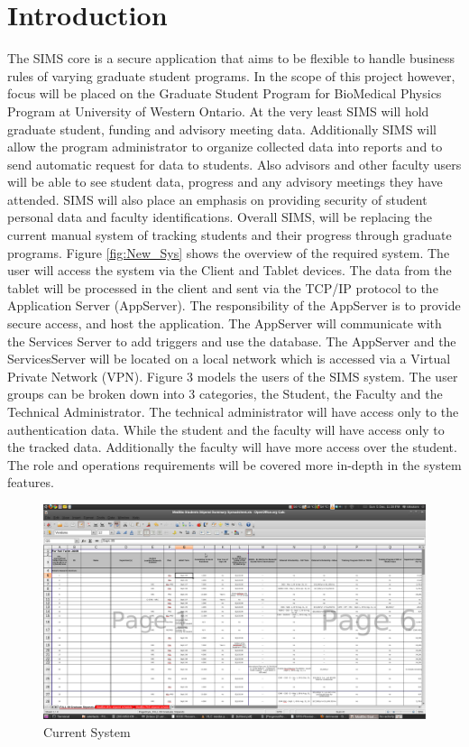 \documentclass{journal}
\begin{document}
\tableofcontents

\section{Introduction}
The SIMS core is a secure application that aims to be flexible to handle business rules of varying graduate
student programs. In the scope of this project however, focus will be placed on the Graduate Student
Program for BioMedical Physics Program at University of Western Ontario. At the very least SIMS
will hold graduate student, funding and advisory meeting data. Additionally SIMS will allow the program
administrator to organize collected data into reports and to send automatic request for data to students.
Also advisors and other faculty users will be able to see student data, progress and any advisory meetings
they have attended. SIMS will also place an emphasis on providing security of student personal data and
faculty identifications. Overall SIMS, will be replacing the current manual system of tracking students and
their progress through graduate programs.
Figure \ref{fig:New_Sys} shows the overview of the required system. The user will access the system via the Client and
Tablet devices. The data from the tablet will be processed in the client and sent via the TCP/IP protocol
to the Application Server (AppServer). The responsibility of the AppServer is to provide secure access, and
host the application. The AppServer will communicate with the Services Server to add triggers and use the
database. The AppServer and the ServicesServer will be located on a local network which is accessed via
a Virtual Private Network (VPN). Figure 3 models the users of the SIMS system. The user groups can be
broken down into 3 categories, the Student, the Faculty and the Technical Administrator. The technical
administrator will have access only to the authentication data. While the student and the faculty will have
access only to the tracked data. Additionally the faculty will have more access over the student. The role
and operations requirements will be covered more in-depth in the system features.
\begin{figure}[htp]
\centering
\includegraphics[scale=0.25]{diagrams/Current_System.png}
\caption{Current System}
\label{fig:Curr_Sys}
\end{figure}
\end{document}
